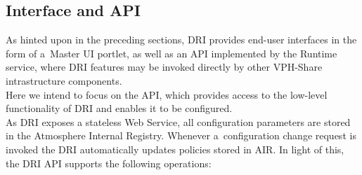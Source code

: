 \subsection{Interface and API}
\label{dri-interface}
As hinted upon in the preceding sections, DRI provides end-user interfaces
in the form of a~Master UI portlet, as well as an API implemented by the
Runtime service, where DRI features may be invoked directly by other VPH-Share
intrastructure components.\\

Here we intend to focus on the API, which provides access to the low-level
functionality of DRI and enables it to be configured.\\

As DRI exposes a stateless Web Service, all configuration parameters are stored
in the Atmosphere Internal Registry. Whenever a~configuration change request
is invoked the DRI automatically updates policies stored in AIR. In light
of this, the DRI API supports the following operations:


